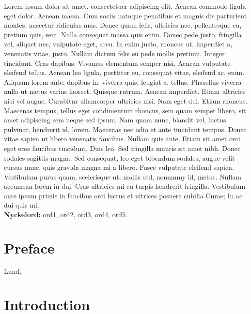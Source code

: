 \documentclass[a4paper,11pt]{article}
\begin{document}
  Lorem ipsum dolor sit amet, consectetuer adipiscing elit. Aenean commodo
  ligula eget dolor. Aenean massa. Cum sociis natoque penatibus et magnis dis
  parturient montes, nascetur ridiculus mus. Donec quam felis, ultricies nec,
  pellentesque eu, pretium quis, sem. Nulla consequat massa quis enim. Donec
  pede justo, fringilla vel, aliquet nec, vulputate eget, arcu. In enim justo,
  rhoncus ut, imperdiet a, venenatis vitae, justo. Nullam dictum felis eu pede
  mollis pretium. Integer tincidunt. Cras dapibus. Vivamus elementum semper
  nisi. Aenean vulputate eleifend tellus. Aenean leo ligula, porttitor eu,
  consequat vitae, eleifend ac, enim. Aliquam lorem ante, dapibus in, viverra
  quis, feugiat a, tellus. Phasellus viverra nulla ut metus varius laoreet.
  Quisque rutrum. Aenean imperdiet. Etiam ultricies nisi vel augue. Curabitur
  ullamcorper ultricies nisi. Nam eget dui. Etiam rhoncus. Maecenas tempus,
  tellus eget condimentum rhoncus, sem quam semper libero, sit amet adipiscing
  sem neque sed ipsum. Nam quam nunc, blandit vel, luctus pulvinar, hendrerit
  id, lorem. Maecenas nec odio et ante tincidunt tempus. Donec vitae sapien ut
  libero venenatis faucibus. Nullam quis ante. Etiam sit amet orci eget eros
  faucibus tincidunt. Duis leo. Sed fringilla mauris sit amet nibh. Donec
  sodales sagittis magna. Sed consequat, leo eget bibendum sodales, augue velit
  cursus nunc, quis gravida magna mi a libero. Fusce vulputate eleifend sapien.
  Vestibulum purus quam, scelerisque ut, mollis sed, nonummy id, metus. Nullam
  accumsan lorem in dui. Cras ultricies mi eu turpis hendrerit fringilla.
  Vestibulum ante ipsum primis in faucibus orci luctus et ultrices posuere
  cubilia Curae; In ac dui quis mi. \\

  \textbf{Nyckelord:} ord1, ord2, ord3, ord4, ord5.


\clearpage

\section*{Preface}

{\large
Lund, \monthname \ \the\year
\vspace{0.7cm} \\
\name
}

\clearpage

\tableofcontents

\clearpage
{}

\section{Introduction}
\end{document}
